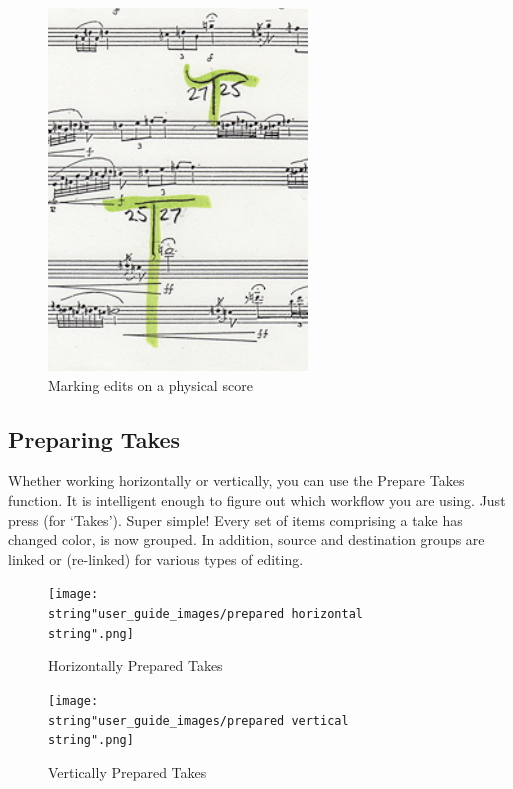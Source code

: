 \documentclass[10pt,american]{article}
\begin{document}
\begin{figure}
\begin{centering}
\includegraphics{user_guide_images/score-edits}
\par\end{centering}
\caption{Marking edits on a physical score}

\end{figure}


\subsection{Preparing Takes}

Whether working horizontally or vertically, you can use the Prepare Takes
function. It is intelligent enough to figure out which workflow you are using.
Just press  (for `Takes'). Super simple! Every set of items comprising a
take has changed color, is now grouped. In addition, source and destination
groups are linked or (re-linked) for various types of editing. 

\begin{figure}
\texttt{[image: \\string"user\_guide\_images/prepared horizontal\\string".png]}

\caption{Horizontally Prepared Takes}

\end{figure}

\begin{figure}
\texttt{[image: \\string"user\_guide\_images/prepared vertical\\string".png]}

\caption{Vertically Prepared Takes}

\end{figure}
\end{document}
